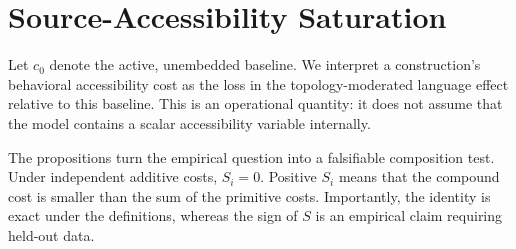 \section{Source-Accessibility Saturation}

Let $c_0$ denote the active, unembedded baseline. We interpret a construction's
behavioral accessibility cost as the loss in the topology-moderated language
effect relative to this baseline. This is an operational quantity: it does not
assume that the model contains a scalar accessibility variable internally.



The propositions turn the empirical question into a falsifiable composition
test. Under independent additive costs, $S_i=0$. Positive $S_i$ means that the
compound cost is smaller than the sum of the primitive costs. Importantly, the
identity is exact under the definitions, whereas the sign of $S$ is an
empirical claim requiring held-out data.
